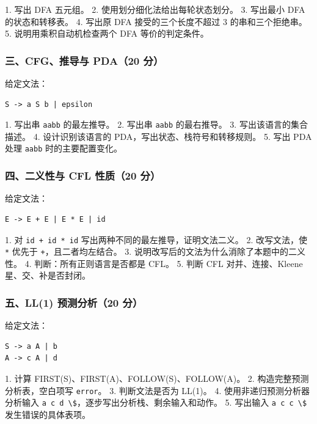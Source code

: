 \documentclass[UTF8]{ctexart}
\begin{document}
1. 写出 DFA 五元组。 2. 使用划分细化法给出每轮状态划分。 3. 写出最小 DFA 的状态和转移表。 4. 写出原 DFA 接受的三个长度不超过 3 的串和三个拒绝串。 5. 说明用乘积自动机检查两个 DFA 等价的判定条件。

\subsubsection*{三、CFG、推导与 PDA（20 分）}

给定文法：

\begin{Verbatim}[fontsize=\small,breaklines=true]
S -> a S b | epsilon
\end{Verbatim}

1. 写出串 \texttt{aabb} 的最左推导。 2. 写出串 \texttt{aabb} 的最右推导。 3. 写出该语言的集合描述。 4. 设计识别该语言的 PDA，写出状态、栈符号和转移规则。 5. 写出 PDA 处理 \texttt{aabb} 时的主要配置变化。

\subsubsection*{四、二义性与 CFL 性质（20 分）}

给定文法：

\begin{Verbatim}[fontsize=\small,breaklines=true]
E -> E + E | E * E | id
\end{Verbatim}

1. 对 \texttt{id + id * id} 写出两种不同的最左推导，证明文法二义。 2. 改写文法，使 \texttt{*} 优先于 \texttt{+}，且二者均左结合。 3. 说明改写后的文法为什么消除了本题中的二义性。 4. 判断：所有正则语言是否都是 CFL。 5. 判断 CFL 对并、连接、Kleene 星、交、补是否封闭。

\subsubsection*{五、LL(1) 预测分析（20 分）}

给定文法：

\begin{Verbatim}[fontsize=\small,breaklines=true]
S -> a A | b
A -> c A | d
\end{Verbatim}

1. 计算 FIRST(S)、FIRST(A)、FOLLOW(S)、FOLLOW(A)。 2. 构造完整预测分析表，空白项写 \texttt{error}。 3. 判断文法是否为 LL(1)。 4. 使用非递归预测分析器分析输入 \texttt{a c d \textbackslash{}\$}，逐步写出分析栈、剩余输入和动作。 5. 写出输入 \texttt{a c c \textbackslash{}\$} 发生错误的具体表项。
\end{document}

